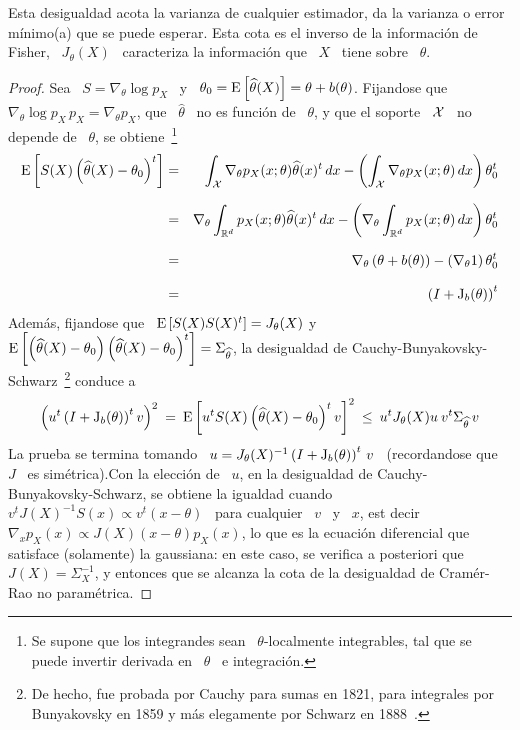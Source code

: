 %
\noindent Esta desigualdad  acota la varianza de cualquier  estimador, \ie da la
varianza o error m\'inimo(a) que se puede esperar. Esta cota es el inverso de la
informaci\'on de Fisher, \ie \  $J_\theta(X)$ \ caracteriza la informaci\'on que
\ $X$ \ tiene sobre \ $\theta$.
%
\begin{proof}
  Sea  \   $S  =  \nabla_\theta  \log   p_X$  \  y  \   $\theta_0  =  \operatorname{E}\left[
    \widehat{\theta}(X)  \right]   =  \theta  +  b(\theta)$.   Fijandose  que  \
  $\nabla_\theta \log p_X \, p_X  = \nabla_\theta p_X$, que \ $\widehat{\theta}$
  \ no  es funci\'on de \ $\theta$,  y que el soporte  \ $\mathcal{X}$ \ no  depende de \
  $\theta$,  se   obtiene~\footnote{Se  supone   que  los  integrandes   sean  \
    $\theta$-localmente  integrables, tal que  se puede  invertir derivada  en \
    $\theta$ \ e integraci\'on.}
  \begin{eqnarray*}
  \operatorname{E}\left[ S(X) \left( \widehat{\theta}(X) - \theta_0 \right)^t \right] & = &
  \int_{\mathcal{X}} \nabla_\theta p_X(x;\theta) \widehat{\theta}(x)^t \, dx - \left(
  \int_{\mathcal{X}} \nabla_\theta p_X(x;\theta) \, dx \right) \theta_0^t\\[2.5mm]
  & = & \nabla_\theta \int_{\mathbb{R}^d} p_X(x;\theta) \widehat{\theta}(x)^t \, dx -
  \left( \nabla_\theta \int_{\mathbb{R}^d} p_X(x;\theta) \, dx \right)
  \theta_0^t\\[2.5mm]
  & = & \nabla_\theta \left( \theta + b(\theta) \right)  - 
  \left( \nabla_\theta 1 \right) \theta_0^t\\[2.5mm]
  & = & \left( I + \operatorname{J}_b(\theta) \right)^t
  \end{eqnarray*}
  Adem\'as, fijandose  que \  $\operatorname{E}\left[ S(X) S(X)^t  \right] =  J_\theta(X)$ y
  $\operatorname{E}\left[   \left(    \widehat{\theta}(X)   -   \theta_0    \right)   \left(
      \widehat{\theta}(X)      -      \theta_0      \right)^t     \right]      =
  \Sigma_{\widehat{\theta}}$,            la            desigualdad            de
  Cauchy-Bunyakovsky-Schwarz~\footnote{De  hecho, fue  probada  por Cauchy  para
    sumas en  1821, para integrales por  Bunyakovsky en 1859  y m\'as elegamente
    por Schwarz en 1888~\cite{Ste04}.}  conduce a
  \[
  \left( u^t \left( I + \operatorname{J}_b(\theta)  \right)^t v \right)^2 \: = \: \operatorname{E}\left[
    u^t S(X) \left( \widehat{\theta}(X) -  \theta_0 \right)^t v \right]^2 \: \le
  \: u^t J_\theta(X) u \: v^t \Sigma_{\widehat{\theta}} \, v
  \]
  La prueba se termina tomando \ $u = J_\theta(X)^{-1} \left( I + \operatorname{J}_b(\theta)
  \right)^t \,  v$ \ (recordandose que  \ $J$ \ es  sim\'etrica).\newline Con la
  elecci\'on  de \  $u$,  en la  desigualdad  de Cauchy-Bunyakovsky-Schwarz,  se
  obtiene la igualdad  cuando \ $v^t J(X)^{-1} S(x) \propto v^t  (x - \theta)$ \
  para cualquier \ $v$ \ y \ $x$,  est decir \ $\nabla_x p_X (x) \propto J(X) (x
  -  \theta)  p_X(x)$,  lo  que  es  la  ecuaci\'on  diferencial  que  satisface
  (solamente) la gaussiana: en este caso, se verifica a posteriori que \ $J(X) =
  \Sigma_X^{-1}$,  y  entonces que  se  alcanza la  cota  de  la desigualdad  de
  Cram\'er-Rao no param\'etrica.
\end{proof}
